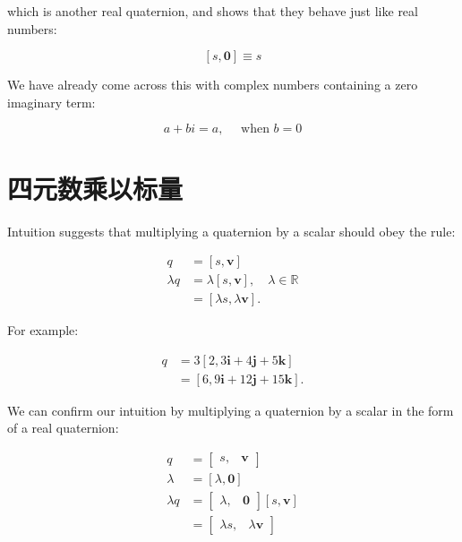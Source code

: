 which is another real quaternion, and shows that they behave just like real numbers:

$$
    [s, \mathbf{0}] \equiv s
$$

We have already come across this with complex numbers containing a zero imaginary term:

$$
    a+b i=a, \quad \text { when } b=0
$$

\section{四元数乘以标量}
Intuition suggests that multiplying a quaternion by a scalar should obey the rule:

$$
    \begin{aligned}
        q         & =[s, \mathbf{v}]                                      \\
        \lambda q & =\lambda[s, \mathbf{v}], \quad \lambda \in \mathbb{R} \\
                  & =[\lambda s, \lambda \mathbf{v}] .
    \end{aligned}
$$

For example:

$$
    \begin{aligned}
        q & =3[2,3 \mathbf{i}+4 \mathbf{j}+5 \mathbf{k}]    \\
          & =[6,9 \mathbf{i}+12 \mathbf{j}+15 \mathbf{k}] .
    \end{aligned}
$$

We can confirm our intuition by multiplying a quaternion by a scalar in the form of a real quaternion:

$$
    \begin{aligned}
        q         & =\left[\begin{array}{ll}
                s, & \mathbf{v}
            \end{array}\right]                \\
        \lambda   & =[\lambda, \mathbf{0}]                                  \\
        \lambda q & =\left[\begin{array}{ll}
                \lambda, & \mathbf{0}
            \end{array}\right][s, \mathbf{v}] \\
                  & =\left[\begin{array}{ll}
                \lambda s, & \lambda \mathbf{v}
            \end{array}\right]
    \end{aligned}
$$

